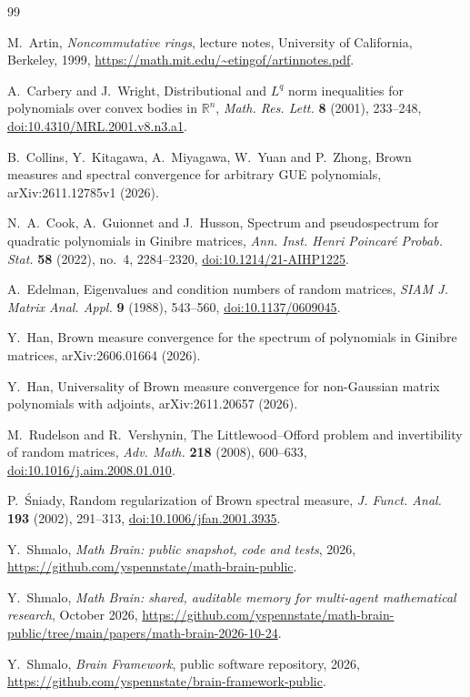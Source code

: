 \documentclass[11pt]{article}
\theoremstyle{remark}
\begin{document}
\begin{thebibliography}{99}

M.~Artin,
\emph{Noncommutative rings},
lecture notes, University of California, Berkeley, 1999,
\url{https://math.mit.edu/~etingof/artinnotes.pdf}.

A.~Carbery and J.~Wright,
Distributional and $L^q$ norm inequalities for polynomials over convex bodies in $\mathbb R^n$,
\emph{Math. Res. Lett.} \textbf{8} (2001), 233--248,
\href{https://doi.org/10.4310/MRL.2001.v8.n3.a1}{doi:10.4310/MRL.2001.v8.n3.a1}.

B.~Collins, Y.~Kitagawa, A.~Miyagawa, W.~Yuan and P.~Zhong,
Brown measures and spectral convergence for arbitrary GUE polynomials,
arXiv:2611.12785v1 (2026).

N.~A.~Cook, A.~Guionnet and J.~Husson,
Spectrum and pseudospectrum for quadratic polynomials in Ginibre matrices,
\emph{Ann. Inst. Henri Poincar\'e Probab. Stat.} \textbf{58} (2022), no.~4, 2284--2320,
\href{https://doi.org/10.1214/21-AIHP1225}{doi:10.1214/21-AIHP1225}.

A.~Edelman,
Eigenvalues and condition numbers of random matrices,
\emph{SIAM J. Matrix Anal. Appl.} \textbf{9} (1988), 543--560,
\href{https://doi.org/10.1137/0609045}{doi:10.1137/0609045}.

Y.~Han,
Brown measure convergence for the spectrum of polynomials in Ginibre matrices,
arXiv:2606.01664 (2026).

Y.~Han,
Universality of Brown measure convergence for non-Gaussian matrix polynomials with adjoints,
arXiv:2611.20657 (2026).

M.~Rudelson and R.~Vershynin,
The Littlewood--Offord problem and invertibility of random matrices,
\emph{Adv. Math.} \textbf{218} (2008), 600--633,
\href{https://doi.org/10.1016/j.aim.2008.01.010}{doi:10.1016/j.aim.2008.01.010}.

P.~\'Sniady,
Random regularization of Brown spectral measure,
\emph{J. Funct. Anal.} \textbf{193} (2002), 291--313,
\href{https://doi.org/10.1006/jfan.2001.3935}{doi:10.1006/jfan.2001.3935}.

 Y.~Shmalo, \emph{Math Brain: public snapshot, code and tests}, 2026, \url{https://github.com/yspennstate/math-brain-public}.

 Y.~Shmalo, \emph{Math Brain: shared, auditable memory for multi-agent mathematical research}, October 2026, \url{https://github.com/yspennstate/math-brain-public/tree/main/papers/math-brain-2026-10-24}.

 Y.~Shmalo, \emph{Brain Framework}, public software repository, 2026, \url{https://github.com/yspennstate/brain-framework-public}.

\end{thebibliography}
\end{document}
